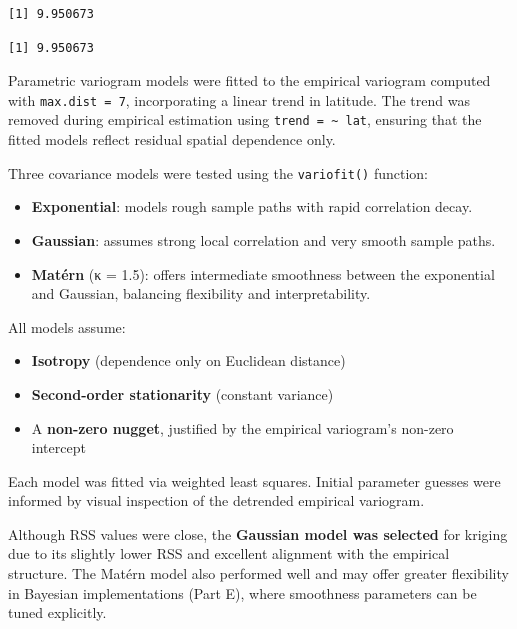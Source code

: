 \documentclass[
  11pt,
]{article}
\newenvironment{Shaded}{\begin{snugshade}}{\end{snugshade}}
\newcommand{\NormalTok}[1]{\textcolor[rgb]{0.00,0.23,0.31}{#1}}
\newcommand{\SpecialCharTok}[1]{\textcolor[rgb]{0.37,0.37,0.37}{#1}}
\begin{document}
\begin{verbatim}
[1] 9.950673
\end{verbatim}

\begin{Shaded}
\end{Shaded}

\begin{verbatim}
[1] 9.950673
\end{verbatim}

Parametric variogram models were fitted to the empirical variogram
computed with \texttt{max.dist\ =\ 7}, incorporating a linear trend in
latitude. The trend was removed during empirical estimation using
\texttt{trend\ =\ \textasciitilde{}\ lat}, ensuring that the fitted
models reflect residual spatial dependence only.

Three covariance models were tested using the \texttt{variofit()}
function:

\begin{itemize}
\item
  \textbf{Exponential}: models rough sample paths with rapid correlation
  decay.
\item
  \textbf{Gaussian}: assumes strong local correlation and very smooth
  sample paths.
\item
  \textbf{Matérn} (κ = 1.5): offers intermediate smoothness between the
  exponential and Gaussian, balancing flexibility and interpretability.
\end{itemize}

All models assume:

\begin{itemize}
\item
  \textbf{Isotropy} (dependence only on Euclidean distance)
\item
  \textbf{Second-order stationarity} (constant variance)
\item
  A \textbf{non-zero nugget}, justified by the empirical variogram's
  non-zero intercept
\end{itemize}

Each model was fitted via weighted least squares. Initial parameter
guesses were informed by visual inspection of the detrended empirical
variogram.

Although RSS values were close, the \textbf{Gaussian model was selected}
for kriging due to its slightly lower RSS and excellent alignment with
the empirical structure. The Matérn model also performed well and may
offer greater flexibility in Bayesian implementations (Part E), where
smoothness parameters can be tuned explicitly.
\end{document}
